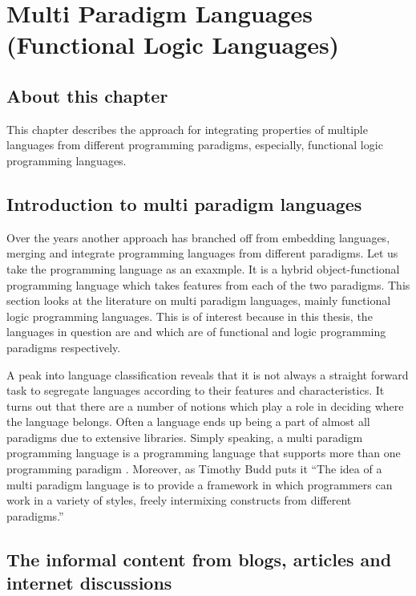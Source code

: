 \documentclass[thesis-solanki.tex]{subfiles}
\begin{document}
\chapter{Multi Paradigm Languages (Functional Logic Languages)}\label{chap:multiparadigm}


\section{About this chapter}

This chapter describes the approach for integrating properties of multiple languages from different programming paradigms, especially, 
functional logic programming languages.  

\section{Introduction to multi paradigm languages}
Over the years another approach has branched off from embedding languages, merging and integrate programming
languages from different paradigms.
Let us take the  programming language \cite{website:scala} as an exaxmple. It is a hybrid
object-functional programming language which takes features from each of the two paradigms.
This section looks at the literature on multi paradigm languages, mainly functional logic programming
languages. This is of interest because in this thesis, the languages in question are  
and  which are of functional and logic programming paradigms respectively.

A peak into language classification reveals that it is not always a straight forward task to segregate languages
according to their features and characteristics.
It turns out that there are a number of notions which play a role in deciding where the language belongs.
Often a language ends up being a part of almost all paradigms due to extensive libraries.
Simply speaking, a multi paradigm programming language is a programming language that supports more than one
programming paradigm \cite{Krishnamurthi:2008:TPL:1480828.1480846}. Moreover, as Timothy Budd puts it
\cite{website:wikimultiparadigm} ``The idea of a multi paradigm language is to provide a framework in which
programmers can work in a variety of styles, freely intermixing constructs from different paradigms.''


\section{The informal content from blogs, articles and internet discussions}
  
\end{document}
